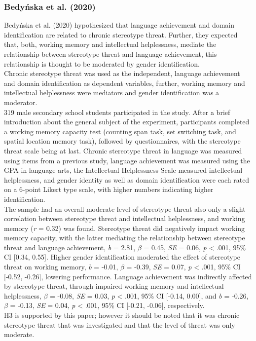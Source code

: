 \documentclass[
  stu,floatsintext]{apa7}
\begin{document}
\subsubsection{Bedyńska et al. (2020)}\label{bedynskastereotypethreatlinked2020}

Bedyńska et al. (2020) hypothesized that language achievement and domain identification are related to chronic stereotype threat.
Further, they expected that, both, working memory and intellectual helplessness, mediate the relationship between stereotype threat and language achievement, this relationship is thought to be moderated by gender identification.\\
Chronic stereotype threat was used as the independent, language achievement and domain identification as dependent variables, further, working memory and intellectual helplessness were mediators and gender identification was a moderator.\\
319 male secondary school students participated in the study.
After a brief introduction about the general subject of the experiment, participants completed a working memory capacity test (counting span task, set switching task, and spatial location memory task), followed by questionnaires, with the stereotype threat scale being at last.
Chronic stereotype threat in language was measured using items from a previous study, language achievement was measured using the GPA in language arts, the Intellectual Helplessness Scale measured intellectual helplessness, and gender identity as well as domain identification were each rated on a 6-point Likert type scale, with higher numbers indicating higher identification.\\
The sample had an overall moderate level of stereotype threat also only a slight correlation between stereotype threat and intellectual helplessness, and working memory (\emph{r} = 0.32) was found.
Stereotype threat did negatively impact working memory capacity, with the latter mediating the relationship between stereotype threat and language achievement, \emph{b} = 2.81, \(\beta\) = 0.45, \emph{SE} = 0.06, \emph{p} \textless{} .001, 95\% CI {[}0.34, 0.55{]}.
Higher gender identification moderated the effect of stereotype threat on working memory, \emph{b} = -0.01, \(\beta\) = -0.39, \emph{SE} = 0.07, \emph{p} \textless{} .001, 95\% CI {[}-0.52, -0.26{]}, lowering performance.
Language achievement was indirectly affected by stereotype threat, through impaired working memory and intellectual helplessness, \(\beta\) = -0.08, \emph{SE} = 0.03, \emph{p} \textless{} .001, 95\% CI {[}-0.14, 0.00{]}, and \emph{b} = -0.26, \(\beta\) = -0.13, \emph{SE} = 0.04, \emph{p} \textless{} .001, 95\% CI {[}-0.21, -0.06{]}, respectively.\\
H3 is supported by this paper; however it should be noted that it was chronic stereotype threat that was investigated and that the level of threat was only moderate.
\end{document}
